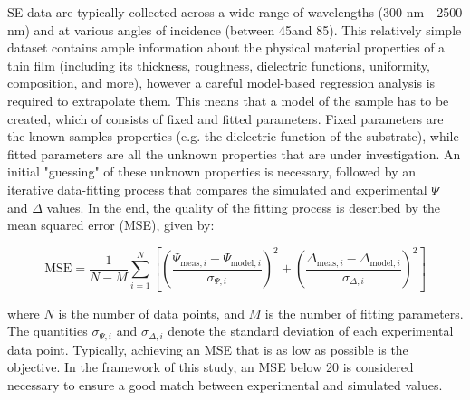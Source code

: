 SE data are typically collected across a wide range of wavelengths (300 nm - 2500 nm) and at various angles of incidence (between 45\degree and 85\degree). This relatively simple dataset contains ample information about the physical material properties of a thin film (including its thickness, roughness, dielectric functions, uniformity, composition, and more), however a careful model-based regression analysis is required to extrapolate them. This means that a model of the sample has to be created, which of consists of fixed and fitted parameters. Fixed parameters are the known samples properties (e.g. the dielectric function of the substrate), while fitted parameters are all the unknown properties that are under investigation. An initial "guessing" of these unknown properties is necessary, followed by an iterative data-fitting process that compares the simulated and experimental $\Psi$ and $\Delta$ values. In the end, the quality of the fitting process is described by the mean squared error (MSE), given by: 




\begin{equation}
\text{MSE} = \frac{1}{N - M} \sum_{i=1}^{N} \left[ \left( \frac{\Psi_{\text{meas},i} - \Psi_{\text{model},i}}{\sigma_{\Psi,i}} \right)^2 + \left( \frac{\Delta_{\text{meas},i} - \Delta_{\text{model},i}}{\sigma_{\Delta,i}} \right)^2 \right]
\label{eq:mse}
\end{equation}

where \( N \) is the number of data points, and \( M \) is the number of fitting parameters. The quantities \( \sigma_{\Psi,i} \) and \( \sigma_{\Delta,i} \) denote the standard deviation of each experimental data point. Typically, achieving an MSE that is as low as possible is the objective. In the framework of this study, an MSE below 20 is considered necessary to ensure a good match between experimental and simulated values. 


